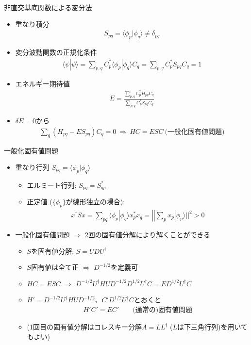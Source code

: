 \begin{frame}[t,fragile]{非直交基底関数による変分法}
  \begin{itemize}
  \item 重なり積分
    \begin{align*}
      S_{pq} = \langle \phi_p | \phi_q \rangle \ne \delta_{pq}
    \end{align*}
  \item 変分波動関数の正規化条件
    \begin{align*}
      \langle \psi | \psi \rangle = \sum_{p,q} C_p^* \langle \phi_p | \phi_q \rangle C_q = \sum_{p,q} C_p^* S_{pq} C_q = 1
    \end{align*}
  \item エネルギー期待値
    \begin{align*}
      E = \frac{\sum_{p,q} C_p^* H_{pq} C_q}{\sum_{p,q} C_p^* S_{pq} C_q}
    \end{align*}
  \item $\delta E = 0$から
    \begin{align*}
      \sum_q (H_{pq} - E S_{pq}) C_q = 0 \ \Rightarrow \ HC = ESC \ \text{(一般化固有値問題)}
    \end{align*}
  \end{itemize}
\end{frame}

\begin{frame}[t,fragile]{一般化固有値問題}
  \begin{itemize}
  \item 重なり行列 $S_{pq} = \langle \phi_p | \phi_q \rangle$
    \begin{itemize}
      \item エルミート行列: $S_{pq} = S_{qp}^*$
      \item 正定値 ($\{\phi_p\}$が線形独立の場合):
        \begin{align*}
          x^\dagger S x = \sum_{pq} \langle \phi_p | \phi_q \rangle x_p^* x_q = || \sum_p x_p | \phi_p \rangle ||^2 > 0
        \end{align*}
    \end{itemize}
  \item 一般化固有値問題 $\Rightarrow$ 2回の固有値分解により解くことができる
    \begin{itemize}
      \item $S$を固有値分解: $S = U D U^\dagger$
      \item $S$固有値は全て正 $\Rightarrow$ $D^{-1/2}$を定義可
      \item $HC=ESC$ $\Rightarrow$ $D^{-1/2} U^\dagger H U D^{-1/2} D^{1/2} U^\dagger C = E D^{1/2} U^\dagger C$
      \item $H' = D^{-1/2} U^\dagger H U D^{-1/2}$、$C'D^{1/2} U^\dagger C$とおくと
        \begin{align*}
          H'C' = EC' \qquad \text{(通常の)固有値問題}
        \end{align*}
      \item (1回目の固有値分解はコレスキー分解$A=L L^\dagger$ ($L$は下三角行列)を用いてもよい)
    \end{itemize}
  \end{itemize}
\end{frame}
